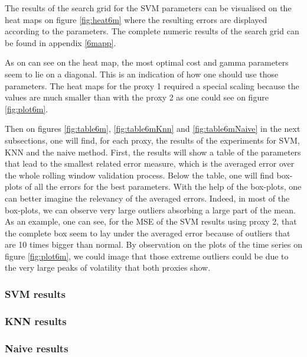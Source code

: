 \documentclass[11pt,a4paper,oneside]{book}
\begin{document}
The results of the search grid for the SVM parameters can be visualised on the heat maps on figure \ref{fig:heat6m} where the resulting errors are displayed according to the parameters. The complete numeric results of the search grid can be found in appendix \ref{6mapp}. 

As on can see on the heat map, the most optimal cost and gamma parameters seem to lie on a diagonal. This is an indication of how one should use those parameters. The heat maps for the proxy 1 required a special scaling because the values are much smaller than with the proxy 2 as one could see on figure \ref{fig:plot6m}.

Then on figures \ref{fig:table6m}, \ref{fig:table6mKnn} and \ref{fig:table6mNaive} in the next subsections, one will find, for each proxy, the results of the experiments for SVM, KNN and the naive method. First, the results will show a table of the parameters that lead to the smallest related error measure, which is the averaged error over the whole rolling window validation process. Below the table, one will find box-plots of all the errors for the best parameters. With the help of the box-plots, one can better imagine the relevancy of the averaged errors. Indeed, in most of the box-plots, we can observe very large outliers absorbing a large part of the mean. As an example, one can see, for the MSE of the SVM results using proxy 2, that the complete box seem to lay under the averaged error because of outliers that are 10 times bigger than normal. By observation on the plots of the time series on figure \ref{fig:plot6m}, we could image that those extreme outliers could be due to the very large peaks of volatility that both proxies show.




\clearpage
\subsubsection{SVM results}


\clearpage
\subsubsection{KNN results}


\clearpage
\subsubsection{Naive results}

\end{document}
